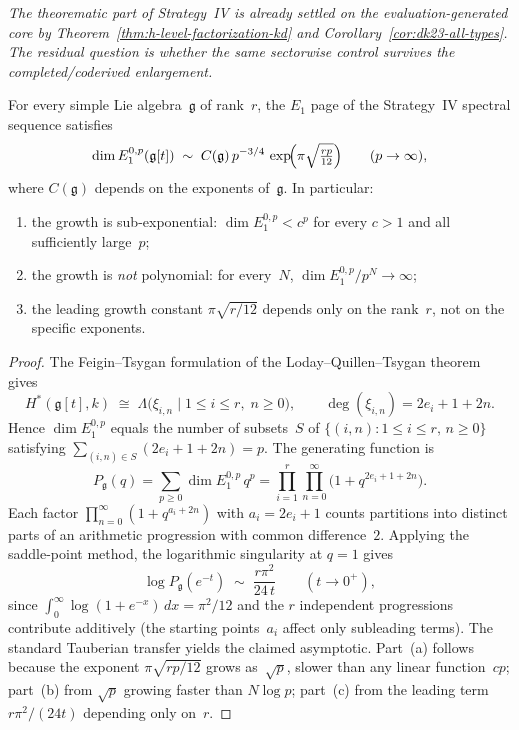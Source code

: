 \begin{remark}
\begin{conjecture}
\emph{The theorematic part of Strategy~IV is already settled on the
evaluation-generated core by
Theorem~\textup{\ref{thm:h-level-factorization-kd}} and
Corollary~\textup{\ref{cor:dk23-all-types}}.  The residual question
is whether the same sectorwise control survives the
completed/coderived enlargement.}
\end{conjecture}

\begin{proposition}
\label{prop:lqt-e1-subexponential-growth}
For every simple Lie algebra~$\mathfrak{g}$ of rank~$r$,
the $E_1$ page of the Strategy~IV spectral sequence satisfies
\[
\dim E_1^{0,p}(\mathfrak{g}[t])
\;\sim\;
C(\mathfrak{g})\,p^{-3/4}\,
\exp\!\Bigl(\pi\sqrt{\tfrac{rp}{12}}\Bigr)
\qquad (p \to \infty),
\]
where $C(\mathfrak{g})$ depends on the exponents of~$\mathfrak{g}$.
In particular:
\begin{enumerate}[label=\textup{(\alph*)}]
\item the growth is sub-exponential: $\dim E_1^{0,p} < c^p$
  for every $c > 1$ and all sufficiently large~$p$;
\item the growth is \emph{not} polynomial: for every~$N$,
  $\dim E_1^{0,p} / p^N \to \infty$;
\item the leading growth constant $\pi\sqrt{r/12}$ depends
  only on the rank~$r$, not on the specific exponents.
\end{enumerate}
\end{proposition}

\begin{proof}
The Feigin--Tsygan formulation of the
Loday--Quillen--Tsygan theorem gives
\[
H^*(\mathfrak{g}[t], k)
\;\cong\;
\Lambda\bigl(\xi_{i,n} \mid
  1 \le i \le r,\; n \ge 0\bigr),
\qquad
\deg(\xi_{i,n}) = 2e_i + 1 + 2n.
\]
Hence $\dim E_1^{0,p}$ equals the number of subsets~$S$ of
$\{(i,n) : 1 \le i \le r,\, n \ge 0\}$ satisfying
$\sum_{(i,n) \in S} (2e_i + 1 + 2n) = p$.
The generating function is
\[
P_{\mathfrak{g}}(q)
= \sum_{p \ge 0} \dim E_1^{0,p}\, q^p
= \prod_{i=1}^{r} \prod_{n=0}^{\infty}
  \bigl(1 + q^{2e_i + 1 + 2n}\bigr).
\]
Each factor $\prod_{n=0}^{\infty}(1 + q^{a_i + 2n})$ with
$a_i = 2e_i + 1$ counts partitions into distinct parts of an
arithmetic progression with common difference~$2$.  Applying
the saddle-point method, the logarithmic singularity at
$q = 1$ gives
\[
\log P_{\mathfrak{g}}(e^{-t})
\;\sim\; \frac{r\pi^2}{24\,t}
\qquad (t \to 0^+),
\]
since $\int_0^\infty \log(1 + e^{-x})\,dx = \pi^2/12$ and the $r$
independent progressions contribute additively (the starting
points~$a_i$ affect only subleading terms).  The standard
Tauberian transfer yields the claimed asymptotic.
Part~(a) follows because the exponent $\pi\sqrt{rp/12}$ grows
as~$\sqrt{p}$, slower than any linear function~$cp$;
part~(b) from $\sqrt{p}$ growing faster than $N\log p$;
part~(c) from the leading term $r\pi^2/(24t)$ depending only
on~$r$.
\end{proof}


\end{remark}
